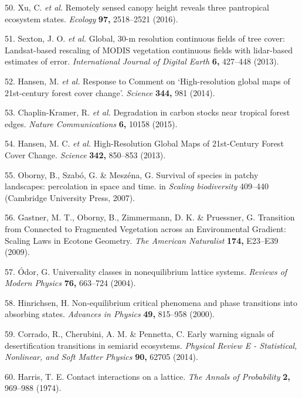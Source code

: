 \documentclass[]{article}
\begin{document}
\hypertarget{ref-Xu2016}{}
50. Xu, C. \emph{et al.} Remotely sensed canopy height reveals three
pantropical ecosystem states. \emph{Ecology} \textbf{97,} 2518--2521
(2016).

\hypertarget{ref-Sexton2013}{}
51. Sexton, J. O. \emph{et al.} Global, 30-m resolution continuous
fields of tree cover: Landsat-based rescaling of MODIS vegetation
continuous fields with lidar-based estimates of error.
\emph{International Journal of Digital Earth} \textbf{6,} 427--448
(2013).

\hypertarget{ref-Hansen2014}{}
52. Hansen, M. \emph{et al.} Response to Comment on `High-resolution
global maps of 21st-century forest cover change'. \emph{Science}
\textbf{344,} 981 (2014).

\hypertarget{ref-Chaplin-Kramer2015}{}
53. Chaplin-Kramer, R. \emph{et al.} Degradation in carbon stocks near
tropical forest edges. \emph{Nature Communications} \textbf{6,} 10158
(2015).

\hypertarget{ref-Hansen2013}{}
54. Hansen, M. C. \emph{et al.} High-Resolution Global Maps of
21st-Century Forest Cover Change. \emph{Science} \textbf{342,} 850--853
(2013).

\hypertarget{ref-Oborny2007}{}
55. Oborny, B., Szabó, G. \& Meszéna, G. Survival of species in patchy
landscapes: percolation in space and time. in \emph{Scaling
biodiversity} 409--440 (Cambridge University Press, 2007).

\hypertarget{ref-Gastner2009}{}
56. Gastner, M. T., Oborny, B., Zimmermann, D. K. \& Pruessner, G.
Transition from Connected to Fragmented Vegetation across an
Environmental Gradient: Scaling Laws in Ecotone Geometry. \emph{The
American Naturalist} \textbf{174,} E23--E39 (2009).

\hypertarget{ref-Odor2004}{}
57. Ódor, G. Universality classes in nonequilibrium lattice systems.
\emph{Reviews of Modern Physics} \textbf{76,} 663--724 (2004).

\hypertarget{ref-Hinrichsen2000}{}
58. Hinrichsen, H. Non-equilibrium critical phenomena and phase
transitions into absorbing states. \emph{Advances in Physics}
\textbf{49,} 815--958 (2000).

\hypertarget{ref-Corrado2014}{}
59. Corrado, R., Cherubini, A. M. \& Pennetta, C. Early warning signals
of desertification transitions in semiarid ecosystems. \emph{Physical
Review E - Statistical, Nonlinear, and Soft Matter Physics} \textbf{90,}
62705 (2014).

\hypertarget{ref-Harris1974}{}
60. Harris, T. E. Contact interactions on a lattice. \emph{The Annals of
Probability} \textbf{2,} 969--988 (1974).
\end{document}
